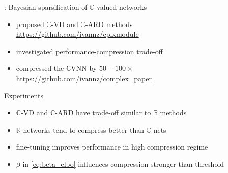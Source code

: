 \documentclass[handout]{beamer}
\newcommand{\real}{\mathbb{R}}
\newcommand{\cplx}{\mathbb{C}}
\begin{document}
\begin{frame}[c]{\insertsection: \insertsubsection}
  Bayesian sparsification of $\cplx$-valued networks
  \begin{itemize}
    \item proposed $\cplx$-VD and $\cplx$-ARD methods
      {\\ \quad \scriptsize{\url{https://github.com/ivannz/cplxmodule}}}
    \smallskip
    \item investigated performance-compression trade-off
    \item compressed the $\cplx$VNN\textsuperscript{\citep{trabelsi_deep_2018}}
    by $50-100\times$  %
      {\\ \quad \scriptsize{\url{https://github.com/ivannz/complex_paper}}}
  \end{itemize}

  \pause
  \medskip
  Experiments
  \begin{itemize}
    \item $\cplx$-VD and $\cplx$-ARD have trade-off similar to $\real$ methods
    \smallskip
    \item $\real$-networks tend to compress better than $\cplx$-nets
    \smallskip
    \item fine-tuning improves performance in high compression regime
    \smallskip
    \item $\beta$ in \ref{eq:beta_elbo} influences compression stronger than threshold
  \end{itemize}


\end{frame}
\end{document}
